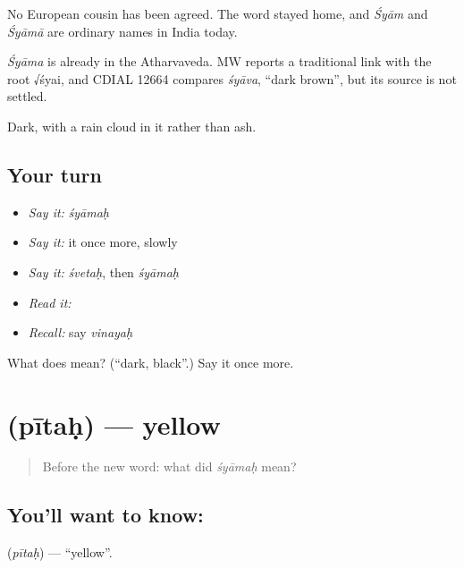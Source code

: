 No European cousin has been agreed. The word stayed home, and \emph{Śyām} and \emph{Śyāmā} are ordinary names in India today.

\begin{cousinweb}
\emph{Śyāma} is already in the Atharvaveda. MW reports a traditional link with the root √śyai, and CDIAL 12664 compares \emph{śyāva}, \textquotedblleft{}dark brown\textquotedblright{}, but its source is not settled.
\end{cousinweb}

\begin{grammarlens}[title={What you've built}]
Dark, with a rain cloud in it rather than ash.
\end{grammarlens}

\subsection*{Your turn}
\begin{itemize}
\raggedright
  \item \emph{Say it:} \emph{śyāmaḥ}
  \item \emph{Say it:} it once more, slowly
  \item \emph{Say it:} \emph{śvetaḥ}, then \emph{śyāmaḥ}
  \item \emph{Read it:} \textbf{}
  \item \emph{Recall:} say \emph{vinayaḥ}
\end{itemize}

\begin{tcolorbox}[breakable,colback=teal!4,colframe=teal!35!black,title={Before you move on}]
What does  mean? (\textquotedblleft{}dark, black\textquotedblright{}.) Say it once more.
\end{tcolorbox}
\section[\texorpdfstring{\sk{पीतः} (pītaḥ)}{पीतः (pītaḥ)}]{ (pītaḥ) — yellow}

\label{lesson:SA-C44-yellow}



\begin{quote}
Before the new word: what did \emph{śyāmaḥ} mean?
\end{quote}

\subsection*{You'll want to know: }
\textbf{} (\emph{pītaḥ}) — \textquotedblleft{}yellow\textquotedblright{}.


